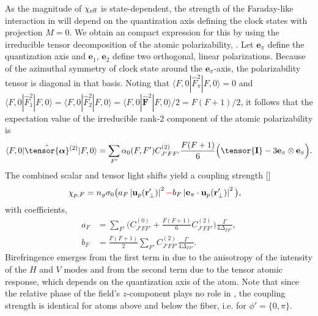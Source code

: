\documentclass[preprint,aps,pra,onecolumn]{revtex4-1} %
\newcommand{\poltens}{\hat{\tensor{\boldsymbol{\alpha}}}}
\newcommand{\unittens}{\tensor{\mathbf{I}}}
\newcommand{\error}[1]{{\color{red} #1}}
\begin{document}
As the magnitude of $\chi_{\text{eff}}$ is state-dependent, the strength of the Faraday-like interaction in  will depend on the quantization axis defining the clock states with projection $M=0$.  We obtain an compact expression for this by using the irreducible tensor decomposition of the atomic polarizability, .  Let $\mathbf{e}_\pi$ define the quantization axis and $\mathbf{e}_{1}$, $\mathbf{e}_{2}$ define two orthogonal, linear polarizations.  Because of the azimuthal symmetry of clock state around the $\mathbf{e}_\pi$-axis, the polarizability tensor is diagonal in that basis.  Noting that $\langle F,0 | \hat{F}_{\pi}^2| F,0 \rangle =0$ and $\langle F,0 | \hat{F}_{1}^2| F,0 \rangle = \langle F,0 | \hat{F}_{2}^2| F,0 \rangle = \langle F,0 | \hat{\mathbf{F}}^2| F,0 \rangle /2 =F(F+1)/2$, it follows that the expectation value of the irreducible rank-2 component of the atomic polarizability is
	\begin{align} \label{Eq::CouplingAngleMagic}
		\langle F,0 | \poltens \phantom{}^{(2)}| F,0 \rangle  %
		= \sum_{F'} \alpha_0(F,F') C^{(2)}_{J'FF'} \frac{F(F+1)}{6} \Big( \unittens - 3\mathbf{e}_\pi \otimes \mathbf{e}_\pi \Big).
	\end{align}
The combined scalar and tensor light shifts yield a coupling strength []
	\begin{align}
		\chi_{p,F} %
		&  = n_g \sigma_0 \big(  a_{F} \left|\mathbf{u}_p(\br'_\perp)\right|^2 \error{-} b_{F} \left|\mathbf{e}_\pi \cdot \mathbf{u}_p(\br'_\perp)\right|^2 \big), \label{Eq::ClockStateCoupling}
	\end{align}
with coefficients,
	\begin{align}
		a_F &= \sum_{F'}  \Big(C^{(0)}_{J'FF'} + \frac{F(F+1)}{6} C^{(2)}_{J'FF'} \Big) \frac{\Gamma}{4 \Delta_{FF'}},\\
		b_F &= \frac{F(F+1)}{2}\sum_{F'} C^{(2)}_{J'FF'}  \frac{\Gamma}{4 \Delta_{FF'}}.
	\end{align}
Birefringence emerges from the first term in  due to the anisotropy of the intensity of the $H$ and $V$ modes and from the second term due to the tensor atomic response, which depends on the quantization axis of the atom.  Note that since the relative phase of the field's $z$-component plays no role in , the coupling strength is identical for atoms above and below the fiber, i.e. for $\phi' = \{0,\pi\}$.
\end{document}
